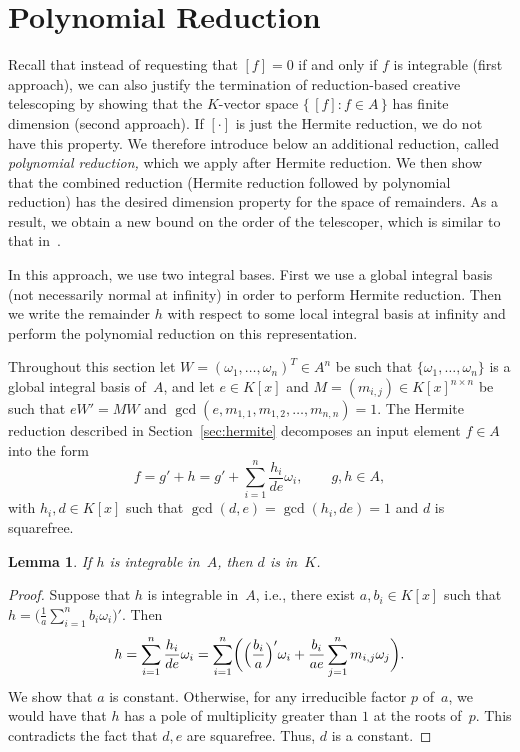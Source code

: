 \documentclass{sig-alternate}
\newtheorem{lemma}[theorem]{Lemma}
\begin{document}
\section{Polynomial Reduction}\label{sec:polynomial}

Recall that instead of requesting that $[f]=0$ if and only if $f$ is integrable
(first approach), we can also justify the termination of reduction-based
creative telescoping by showing that the $K$-vector space $\{\,[f]:f\in A\,\}$
has finite dimension (second approach). If $[\cdot]$ is just the Hermite
reduction, we do not have this property. We therefore introduce below an
additional reduction, called \emph{polynomial reduction,} which we apply after
Hermite reduction. We then show that the combined reduction (Hermite reduction
followed by polynomial reduction) has the desired dimension property for the
space of remainders. As a result, we obtain a new bound on the order of the
telescoper, which is similar to that in~\cite{chen14a}.

In this approach, we use two integral bases. First we use a global integral basis (not
necessarily normal at infinity) in order to perform Hermite reduction. Then we write the
remainder $h$ with respect to some local integral basis at infinity and perform the
polynomial reduction on this representation.

Throughout this section let $W=(\omega_1,\ldots,\omega_n)^T\in A^n$ be such
that $\{\omega_1, \ldots, \omega_n\}$ is a global integral basis of~$A$, and
let $e\in K[x]$ and $M=(m_{i,j})\in K[x]^{n\times n}$ be such that $eW'=MW$
and $\gcd(e, m_{1, 1}, m_{1, 2}, \ldots, m_{n ,n})=1$. The Hermite reduction
described in Section~\ref{sec:hermite} decomposes an input element $f\in A$
into the form
\[
  f = g' + h = g' + \sum_{i=1}^n \frac{h_i}{de} \omega_i,\qquad
  g, h\in A,
\]
with $h_i, d\in K[x]$ such that $\gcd(d, e)=\gcd(h_i,de)=1$ and $d$ is squarefree.
\begin{lemma}\label{LEM:d}
If $h$ is integrable in~$A$, then $d$ is in~$K$.
\end{lemma}
\begin{proof}
Suppose that $h$ is integrable in~$A$, i.e., there exist $a, b_i\in K[x]$
such that $h = \bigl(\frac{1}{a}\sum_{i=1}^n b_i \omega_i\bigr)'$. Then
\[
  h = \sum_{i=1}^n \frac{h_i}{de}\omega_i= \sum_{i=1}^n \biggl(\Bigl(\frac{b_i}{a}\Bigr)' \omega_i +
  \frac{b_i}{a e} \sum_{j=1}^n  m_{i, j}\omega_j\biggr).
\]
We show that $a$ is constant. Otherwise, for any irreducible factor $p$ of~$a$, we would have that $h$ has a pole of
multiplicity greater than $1$ at the roots of~$p$. This contradicts
the fact that $d, e$ are squarefree. Thus, $d$ is a constant.
\end{proof}
\end{document}
